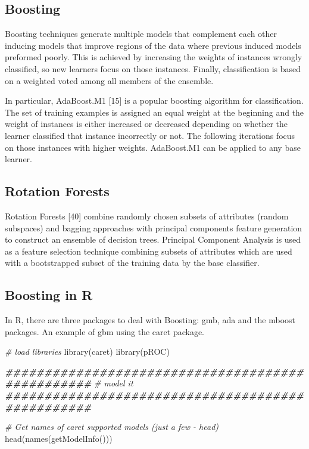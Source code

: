 \documentclass[
]{book}
\newenvironment{Shaded}{\begin{snugshade}}{\end{snugshade}}
\newcommand{\CommentTok}[1]{\textcolor[rgb]{0.56,0.35,0.01}{\textit{#1}}}
\newcommand{\DocumentationTok}[1]{\textcolor[rgb]{0.56,0.35,0.01}{\textbf{\textit{#1}}}}
\newcommand{\FunctionTok}[1]{\textcolor[rgb]{0.00,0.00,0.00}{#1}}
\newcommand{\NormalTok}[1]{#1}
\begin{document}
\hypertarget{boosting}{%
\subsection{Boosting}\label{boosting}}

Boosting techniques generate multiple models that complement each other inducing models that improve regions of the data where previous induced models preformed poorly. This is achieved by increasing the weights of instances wrongly classified, so new learners focus on those instances. Finally, classification is based on a weighted voted among all members of the ensemble.

In particular, AdaBoost.M1 {[}15{]} is a popular boosting algorithm for classification. The set of training examples is assigned an equal weight at the beginning and the weight of instances is either increased or
decreased depending on whether the learner classified that instance incorrectly or not. The following iterations focus on those instances with higher weights. AdaBoost.M1 can be applied to any base learner.

\hypertarget{rotation-forests}{%
\subsection{Rotation Forests}\label{rotation-forests}}

Rotation Forests {[}40{]} combine randomly chosen subsets of attributes (random subspaces) and bagging approaches with principal components feature generation to construct an ensemble of decision trees. Principal Component Analysis is used as a feature selection technique combining subsets of
attributes which are used with a bootstrapped subset of the training data by the base classifier.

\hypertarget{boosting-in-r}{%
\subsection{Boosting in R}\label{boosting-in-r}}

In R, there are three packages to deal with Boosting: gmb, ada and the mboost packages. An example of gbm using the caret package.

\begin{Shaded}
\begin{Highlighting}[]
\CommentTok{\# load libraries}
\FunctionTok{library}\NormalTok{(caret)}
\FunctionTok{library}\NormalTok{(pROC)}

\DocumentationTok{\#\#\#\#\#\#\#\#\#\#\#\#\#\#\#\#\#\#\#\#\#\#\#\#\#\#\#\#\#\#\#\#\#\#\#\#\#\#\#\#\#\#\#\#\#\#\#\#\#}
\CommentTok{\# model it}
\DocumentationTok{\#\#\#\#\#\#\#\#\#\#\#\#\#\#\#\#\#\#\#\#\#\#\#\#\#\#\#\#\#\#\#\#\#\#\#\#\#\#\#\#\#\#\#\#\#\#\#\#\#}

\CommentTok{\# Get names of caret supported models (just a few {-} head)}
\FunctionTok{head}\NormalTok{(}\FunctionTok{names}\NormalTok{(}\FunctionTok{getModelInfo}\NormalTok{()))}
\end{Highlighting}
\end{Shaded}
\end{document}
